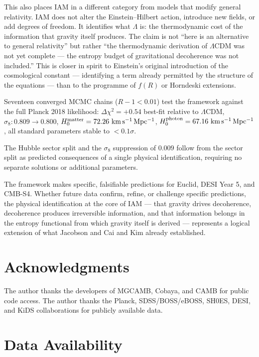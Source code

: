\documentclass[twocolumn,a4paper,aps,prd,twocolumn,showpacs,notitlepage,superscriptaddress,nofootinbib]{article}
\newcommand{\LCDM}{$\Lambda$CDM}
\newcommand{\Hmat}{H_{0}^{\rm matter}}
\newcommand{\Hphot}{H_{0}^{\rm photon}}
\newcommand{\Dchisq}{\Delta\chi^{2}}
\begin{document}
This also places IAM in a different category from models that modify
general relativity.
IAM does not alter the Einstein--Hilbert action, introduce new fields,
or add degrees of freedom.
It identifies what $\Lambda$ is: the thermodynamic cost of the
information that gravity itself produces.
The claim is not ``here is an alternative to general relativity'' but
rather ``the thermodynamic derivation of \LCDM{} was not yet complete ---
the entropy budget of gravitational decoherence was not included.''
This is closer in spirit to Einstein's original introduction of the
cosmological constant --- identifying a term already permitted by the
structure of the equations --- than to the programme of $f(R)$ or
Horndeski extensions.

Seventeen converged MCMC chains ($R-1 < 0.01$) test the framework against
the full Planck 2018 likelihood: $\Dchisq = +0.54$ best-fit relative to
\LCDM{}, $\sigma_8: 0.809 \to 0.800$, $\Hmat = 72.26~\rm km\,s^{-1}\,Mpc^{-1}$,
$\Hphot = 67.16~\rm km\,s^{-1}\,Mpc^{-1}$, all standard parameters stable to
$< 0.1\sigma$.

The Hubble sector split and the $\sigma_8$ suppression of $0.009$ follow
from the sector split as predicted consequences of a single physical
identification, requiring no separate solutions or additional parameters.

The framework makes specific, falsifiable predictions for Euclid, DESI Year 5,
and CMB-S4.  Whether future data confirm, refine, or challenge specific
predictions, the physical identification at the core of IAM — that gravity
drives decoherence, decoherence produces irreversible information, and that
information belongs in the entropy functional from which gravity itself is
derived — represents a logical extension of what Jacobson and Cai and Kim
already established.


\section*{Acknowledgments}

The author thanks the developers of MGCAMB, Cobaya, and CAMB for public code
access.  The author thanks the Planck, SDSS/BOSS/eBOSS, SH0ES, DESI, and
KiDS collaborations for publicly available data.

\section*{Data Availability}
\end{document}
